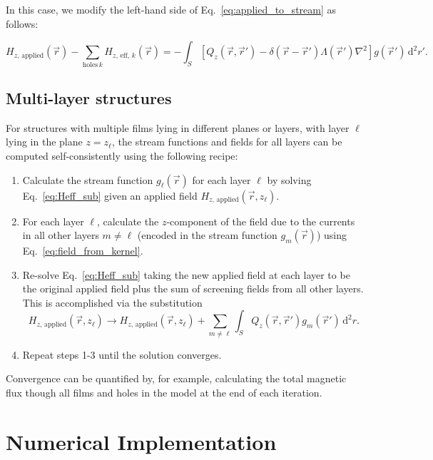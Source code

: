 \documentclass[preprint,12pt]{elsarticle}
\newcounter{bla}
\begin{document}
In this case, we modify the left-hand side of Eq.~\ref{eq:applied_to_stream} as follows:

\begin{equation}
    \label{eq:Heff_sub}
    H_{z,\,\mathrm{applied}}(\vec{r}) - \sum_{\mathrm{holes}\,k} H_{z,\,\mathrm{eff},\,k}(\vec{r})
    = -\int_S\left[
        Q_z(\vec{r},\vec{r}')-\delta(\vec{r}-\vec{r}')\Lambda(\vec{r}')\nabla^2\right
    ]g(\vec{r}')\,\mathrm{d}^2r'.
\end{equation}

\subsection{Multi-layer structures}
\label{section:model:multilayer}

For structures with multiple films lying in different planes or layers, with layer $\ell$ lying in the plane $z=z_\ell$,
the stream functions and fields for all layers can be computed self-consistently using the following recipe:

\begin{enumerate}
    \item{
        Calculate the stream function $g_\ell(\vec{r})$ for each layer $\ell$ by solving Eq.~\ref{eq:Heff_sub} given an applied field $H_{z,\,\mathrm{applied}}(\vec{r}, z_\ell)$.
    }
    \item{
        For each layer $\ell$, calculate the $z$-component of the field due to the currents in all other layers $m\neq\ell$ (encoded in the stream function $g_m(\vec{r})$)
        using Eq.~\ref{eq:field_from_kernel}.
    }
    \item{
        Re-solve Eq.~\ref{eq:Heff_sub} taking the new applied field at each layer to be the original applied field plus the sum of screening fields from all other layers. This is accomplished via the substitution
        $$
            H_{z,\,\mathrm{applied}}(\vec{r}, z_\ell) \to
            H_{z,\,\mathrm{applied}}(\vec{r}, z_\ell)
            + \sum_{m\neq\ell}
            \int_S Q_z(\vec{r},\vec{r}')g_m(\vec{r}')\,\mathrm{d}^2r.
        $$
    }
    \item{
        Repeat steps 1-3 until the solution converges.
    }
\end{enumerate}

Convergence can be quantified by, for example, calculating the total magnetic flux though all films and holes in the model at the end of each iteration.

\section{Numerical Implementation}
\label{section:implementation}
\end{document}
